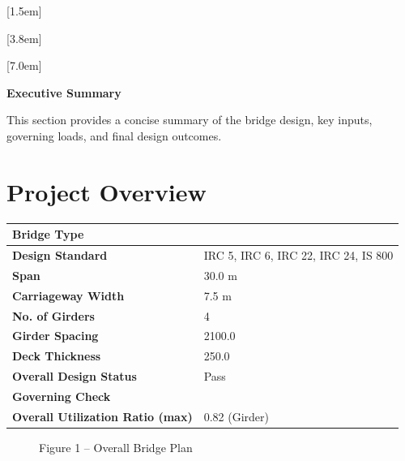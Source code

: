 \documentclass[12pt,a4paper]{report}
\numberwithin{table}{chapter}
\numberwithin{figure}{chapter}
\begin{document}
[1.5em]
  {\normalfont\vspace{2pt}}
  {\contentslabel{1.5em}}
  {\hspace*{-1.5em}}
  {\hfill\contentspage}

[3.8em]
  {\normalfont}
  {\contentslabel{2.3em}}
  {\hspace*{-2.3em}}
  {\hfill\contentspage}

[7.0em]
  {\normalfont}
  {\contentslabel{3.2em}}
  {\hspace*{-3.2em}}
  {\hfill\contentspage}

\newpage
\renewcommand{\contentsname}{\centering\Large\bfseries Table of Contents}
\tableofcontents


\newpage
{\centering\Large\bfseries Executive Summary\par}
\vspace{0.8em}

This section provides a concise summary of the bridge design, key inputs, governing loads, and final design outcomes.

\section*{Project Overview}
\label{sec:project-overview}


\begin{tabular}{|L{5.5cm}|L{8.5cm}|}
\hline
\textbf{Bridge Type} &  \\
\hline
\textbf{Design Standard} & IRC 5, IRC 6, IRC 22, IRC 24, IS 800 \\
\hline
\textbf{Span} & 30.0 m \\
\hline
\textbf{Carriageway Width} & 7.5 m \\
\hline
\textbf{No. of Girders} & 4 \\
\hline
\textbf{Girder Spacing} & 2100.0 \\
\hline
\textbf{Deck Thickness} & 250.0 \\
\hline
\textbf{Overall Design Status} & Pass \\
\hline
\textbf{Governing Check} &  \\
\hline
\textbf{Overall Utilization Ratio (max)} & 0.82 (Girder) \\
\hline
\end{tabular}


\begin{figure}[H]
\centering
{}
\caption*{Figure 1 -- Overall Bridge Plan}
\end{figure}
\end{document}
